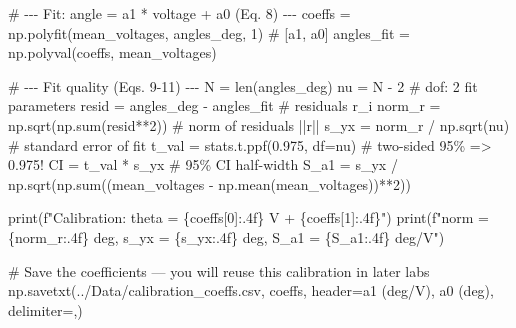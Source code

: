 \documentclass[
  12pt,
  letterpaper,
]{article}
\newenvironment{Shaded}{\begin{snugshade}}{\end{snugshade}}
\newcommand{\BuiltInTok}[1]{\textcolor[rgb]{0.00,0.23,0.31}{#1}}
\newcommand{\CommentTok}[1]{\textcolor[rgb]{0.37,0.37,0.37}{#1}}
\newcommand{\DecValTok}[1]{\textcolor[rgb]{0.68,0.00,0.00}{#1}}
\newcommand{\FloatTok}[1]{\textcolor[rgb]{0.68,0.00,0.00}{#1}}
\newcommand{\NormalTok}[1]{\textcolor[rgb]{0.00,0.23,0.31}{#1}}
\newcommand{\OperatorTok}[1]{\textcolor[rgb]{0.37,0.37,0.37}{#1}}
\newcommand{\SpecialCharTok}[1]{\textcolor[rgb]{0.37,0.37,0.37}{#1}}
\newcommand{\SpecialStringTok}[1]{\textcolor[rgb]{0.13,0.47,0.30}{#1}}
\newcommand{\StringTok}[1]{\textcolor[rgb]{0.13,0.47,0.30}{#1}}
\begin{document}
\begin{Shaded}
\begin{Highlighting}[]
\CommentTok{\# {-}{-}{-} Fit: angle = a1 * voltage + a0  (Eq. 8) {-}{-}{-}}
\NormalTok{coeffs     }\OperatorTok{=}\NormalTok{ np.polyfit(mean\_voltages, angles\_deg, }\DecValTok{1}\NormalTok{)   }\CommentTok{\# [a1, a0]}
\NormalTok{angles\_fit }\OperatorTok{=}\NormalTok{ np.polyval(coeffs, mean\_voltages)}

\CommentTok{\# {-}{-}{-} Fit quality (Eqs. 9{-}11) {-}{-}{-}}
\NormalTok{N      }\OperatorTok{=} \BuiltInTok{len}\NormalTok{(angles\_deg)}
\NormalTok{nu     }\OperatorTok{=}\NormalTok{ N }\OperatorTok{{-}} \DecValTok{2}                                  \CommentTok{\# dof: 2 fit parameters}
\NormalTok{resid  }\OperatorTok{=}\NormalTok{ angles\_deg }\OperatorTok{{-}}\NormalTok{ angles\_fit                }\CommentTok{\# residuals r\_i}
\NormalTok{norm\_r }\OperatorTok{=}\NormalTok{ np.sqrt(np.}\BuiltInTok{sum}\NormalTok{(resid}\OperatorTok{**}\DecValTok{2}\NormalTok{))              }\CommentTok{\# norm of residuals ||r||}
\NormalTok{s\_yx   }\OperatorTok{=}\NormalTok{ norm\_r }\OperatorTok{/}\NormalTok{ np.sqrt(nu)                   }\CommentTok{\# standard error of fit}
\NormalTok{t\_val  }\OperatorTok{=}\NormalTok{ stats.t.ppf(}\FloatTok{0.975}\NormalTok{, df}\OperatorTok{=}\NormalTok{nu)              }\CommentTok{\# two{-}sided 95\% =\textgreater{} 0.975!}
\NormalTok{CI     }\OperatorTok{=}\NormalTok{ t\_val }\OperatorTok{*}\NormalTok{ s\_yx                           }\CommentTok{\# 95\% CI half{-}width}
\NormalTok{S\_a1   }\OperatorTok{=}\NormalTok{ s\_yx }\OperatorTok{/}\NormalTok{ np.sqrt(np.}\BuiltInTok{sum}\NormalTok{((mean\_voltages }\OperatorTok{{-}}\NormalTok{ np.mean(mean\_voltages))}\OperatorTok{**}\DecValTok{2}\NormalTok{))}

\BuiltInTok{print}\NormalTok{(}\SpecialStringTok{f"Calibration: theta = }\SpecialCharTok{\{}\NormalTok{coeffs[}\DecValTok{0}\NormalTok{]}\SpecialCharTok{:.4f\}}\SpecialStringTok{ V + }\SpecialCharTok{\{}\NormalTok{coeffs[}\DecValTok{1}\NormalTok{]}\SpecialCharTok{:.4f\}}\SpecialStringTok{"}\NormalTok{)}
\BuiltInTok{print}\NormalTok{(}\SpecialStringTok{f"norm = }\SpecialCharTok{\{}\NormalTok{norm\_r}\SpecialCharTok{:.4f\}}\SpecialStringTok{ deg, s\_yx = }\SpecialCharTok{\{}\NormalTok{s\_yx}\SpecialCharTok{:.4f\}}\SpecialStringTok{ deg, S\_a1 = }\SpecialCharTok{\{}\NormalTok{S\_a1}\SpecialCharTok{:.4f\}}\SpecialStringTok{ deg/V"}\NormalTok{)}

\CommentTok{\# Save the coefficients — you will reuse this calibration in later labs}
\NormalTok{np.savetxt(}\StringTok{\textquotesingle{}../Data/calibration\_coeffs.csv\textquotesingle{}}\NormalTok{, coeffs,}
\NormalTok{           header}\OperatorTok{=}\StringTok{\textquotesingle{}a1 (deg/V), a0 (deg)\textquotesingle{}}\NormalTok{, delimiter}\OperatorTok{=}\StringTok{\textquotesingle{},\textquotesingle{}}\NormalTok{)}
\end{Highlighting}
\end{Shaded}
\end{document}
